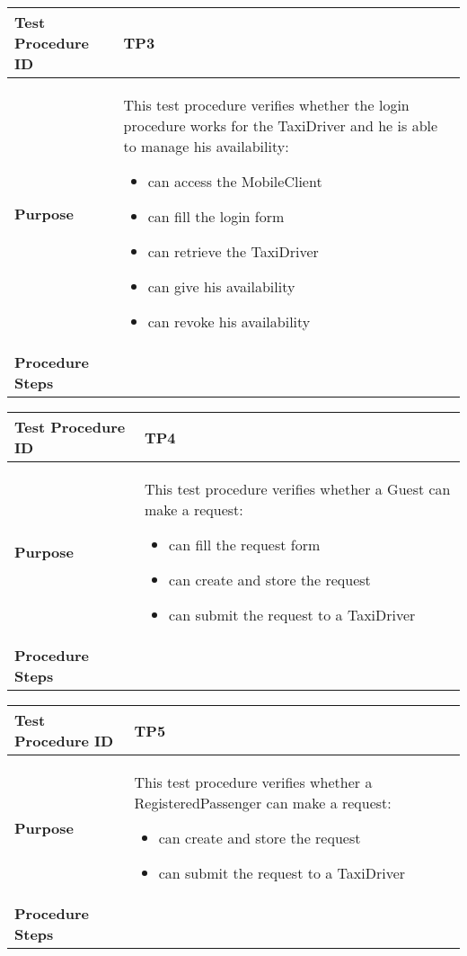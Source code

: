 			\\ \\
			\begin{tabular}{p{4cm} | p{8cm}} \hline
				\textbf{Test Procedure ID} & TP3 \\ \hline
				\textbf{Purpose} & This test procedure verifies whether the login procedure works
				for the TaxiDriver and he is able to manage his availability:
				\begin{itemize}
					\item can access the MobileClient
					\item can fill the login form
					\item can retrieve the TaxiDriver
					\item can give his availability
					\item can revoke his availability
				\end{itemize}
				\\ \hline
				\textbf{Procedure Steps} &  \\ \hline
			\end{tabular}
			\begin{tabular}{p{4cm} | p{8cm}} \hline
				\textbf{Test Procedure ID} & TP4 \\ \hline
				\textbf{Purpose} & This test procedure verifies whether a Guest can make a request:
				\begin{itemize}
					\item can fill the request form
					\item can create and store the request
					\item can submit the request to a TaxiDriver
				\end{itemize}
				\\ \hline
				\textbf{Procedure Steps} &  \\ \hline
			\end{tabular}
			\begin{tabular}{p{4cm} | p{8cm}} \hline
				\textbf{Test Procedure ID} & TP5 \\ \hline
				\textbf{Purpose} & This test procedure verifies whether a RegisteredPassenger can make a request:
				\begin{itemize}
					\item can create and store the request
					\item can submit the request to a TaxiDriver
				\end{itemize}
				\\ \hline
				\textbf{Procedure Steps} &  \\ \hline
			\end{tabular}
